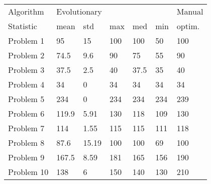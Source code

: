 \begin{tabular}{lllllll}
\toprule
Algorithm & \multicolumn{5}{l}{Evolutionary} & Manual \\
Statistic &         mean &    std &  max &   med &  min & optim. \\
\midrule
Problem 1  &           95 &     15 &  100 &   100 &   50 &    100 \\
Problem 2  &         74.5 &    9.6 &   90 &    75 &   55 &     90 \\
Problem 3  &         37.5 &    2.5 &   40 &  37.5 &   35 &     40 \\
Problem 4  &           34 &      0 &   34 &    34 &   34 &     34 \\
Problem 5  &          234 &      0 &  234 &   234 &  234 &    239 \\
Problem 6  &        119.9 &   5.91 &  130 &   118 &  109 &    130 \\
Problem 7  &          114 &   1.55 &  115 &   115 &  111 &    118 \\
Problem 8  &         87.6 &  15.19 &  100 &   100 &   69 &    100 \\
Problem 9  &        167.5 &   8.59 &  181 &   165 &  156 &    190 \\
Problem 10 &          138 &      6 &  150 &   140 &  130 &    210 \\
\bottomrule
\end{tabular}
